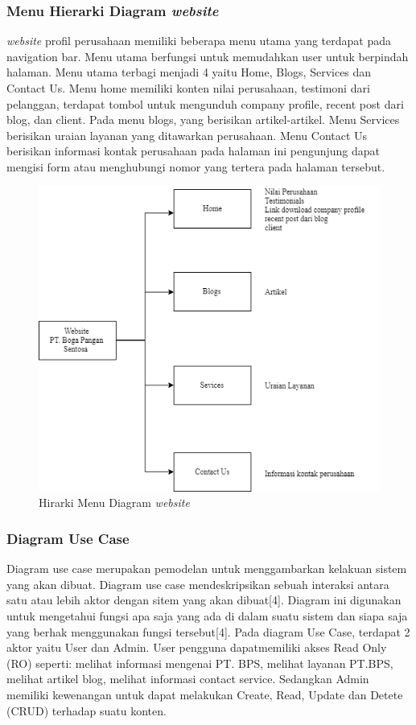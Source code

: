 \pagebreak
\subsubsection{Menu Hierarki Diagram \emph{website}}
\emph{website} profil perusahaan memiliki beberapa menu utama yang terdapat pada navigation bar. 
Menu utama berfungsi untuk memudahkan user untuk  berpindah halaman. 
Menu utama terbagi menjadi 4 yaitu Home, Blogs, Services dan Contact Us. 
Menu home memiliki konten nilai perusahaan, testimoni dari pelanggan, 
terdapat tombol untuk mengunduh company profile, recent post dari blog, dan client. 
Pada menu blogs, yang berisikan artikel-artikel. Menu Services berisikan uraian layanan yang 
ditawarkan perusahaan. 
Menu Contact Us berisikan informasi kontak perusahaan pada halaman ini pengunjung dapat mengisi 
form atau menghubungi nomor yang tertera pada halaman tersebut.

\begin{figure}[htbp]
    \begin{center}
    \includegraphics[width=12cm]{img/diag-menu.png}
    \caption{Hirarki Menu Diagram \emph{website}}
    \label{gambar:diag-menu}
    \end{center}
\end{figure}

\pagebreak
\subsubsection{Diagram Use Case}

Diagram use case merupakan pemodelan untuk menggambarkan kelakuan sistem yang akan dibuat. 
Diagram use case mendeskripsikan sebuah interaksi antara satu atau lebih aktor dengan sitem yang akan dibuat[4]. 
Diagram ini digunakan untuk mengetahui fungsi apa saja yang ada di dalam suatu sistem dan siapa saja yang berhak 
menggunakan fungsi tersebut[4]. Pada diagram Use Case, terdapat 2 aktor yaitu User dan Admin. User pengguna 
dapatmemiliki akses Read Only (RO) seperti:  melihat informasi mengenai PT. BPS, melihat layanan PT.BPS, melihat 
artikel blog, melihat informasi contact service. Sedangkan Admin memiliki kewenangan untuk dapat melakukan Create, 
Read, Update dan Detete (CRUD) terhadap suatu konten. 


